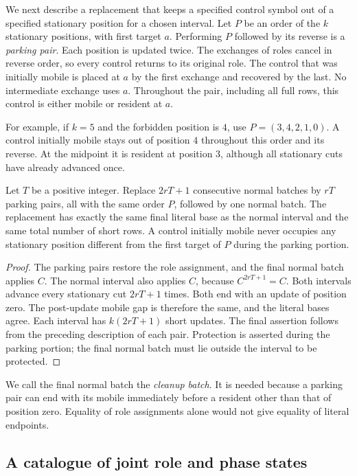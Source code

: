 We next describe a replacement that keeps a specified control symbol out
of a specified stationary position for a chosen interval. Let $P$ be an
order of the $k$ stationary positions, with first target $a$. Performing
$P$ followed by its reverse is a \emph{parking pair}. Each position is
updated twice. The exchanges of roles cancel in reverse order, so every
control returns to its original role. The control that was initially
mobile is placed at $a$ by the first exchange and recovered by the last.
No intermediate exchange uses $a$. Throughout the pair, including all
full rows, this control is either mobile or resident at $a$.

For example, if $k=5$ and the forbidden position is $4$, use
$P=(3,4,2,1,0)$. A control initially mobile stays out of position $4$
throughout this order and its reverse. At the midpoint it is resident at
position $3$, although all stationary cuts have already advanced once.

\begin{lemma}
\label{geo:parking-endpoint}
Let $T$ be a positive integer. Replace $2rT+1$ consecutive normal batches
by $rT$ parking pairs, all with the same order $P$, followed by one normal
batch. The replacement has exactly the same final literal base as the
normal interval and the same total number of short rows. A control
initially mobile never occupies any stationary position different from
the first target of $P$ during the parking portion.
\end{lemma}
\begin{proof}
The parking pairs restore the role assignment, and the final normal
batch applies $C$. The normal interval also applies $C$, because
$C^{2rT+1}=C$. Both intervals advance every stationary cut $2rT+1$ times.
Both end with an update of position zero. The post-update mobile gap is
therefore the same, and the literal bases agree. Each interval has
$k(2rT+1)$ short updates. The final assertion follows from the preceding
description of each pair. Protection is asserted during the parking
portion; the final normal batch must lie outside the interval to be
protected.
\end{proof}

We call the final normal batch the \emph{cleanup batch}. It is needed
because a parking pair can end with its mobile immediately before a
resident other than that of position zero. Equality of role assignments
alone would not give equality of literal endpoints.

\subsection{A catalogue of joint role and phase states}

